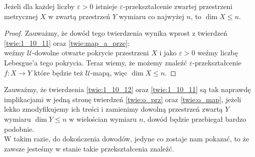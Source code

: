 \begin{twie} %
    \label{twie:1_10_12}
    Jeżeli dla każdej liczby $\varepsilon>0$ istnieje $\varepsilon$-przekształcenie zwartej przestrzeni metrycznej $X$ w zwartą przestrzeń $Y$ wymiaru co najwyżej $n$, to $\dim X\le n$.
\end{twie}
\begin{proof}
    Zauważmy, że dowód tego twierdzenia wynika wprost z twierdzeń \ref{twie:1_10_11} oraz \ref{twie:map_a_prze}: \\
    weźmy $\mathcal{U}$-dowolne otwarte pokrycie przestrzeni $X$ i jako $\varepsilon>0$ weźmy liczbę Lebesgue'a tego pokrycia. Teraz wiemy, że możemy znaleźć $\varepsilon$-przekształcenie $f:X\rightarrow Y$ które będzie też $\mathcal{U}$-mapą, więc $\dim X\le n$.
\end{proof}

Zauważmy, że twierdzenia \ref{twie:1_10_12} oraz \ref{twie:1_10_11} są tak naprawdę implikacjami w jedną stronę twierdzeń \ref{twie:o_prz} oraz \ref{twie:o_map}, jeżeli lekko zmodyfikujemy ich treści i zamienimy dowolną przestrzeń zwartą $Y$ wymiaru $\dim Y \le n$ w wielościan wymiaru $n$, dowód będzie przebiegał bardzo podobnie. \\
W takim razie, do dokończenia dowodów, jedyne co zostaje nam pokazać, to że zawsze jesteśmy w stanie takie przekształcenia znaleźć.

